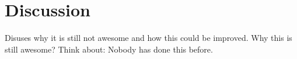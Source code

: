 \section{Discussion}
Disuses why it is still not awesome and how this could be improved. Why this is still awesome? Think about: Nobody has done this before. 